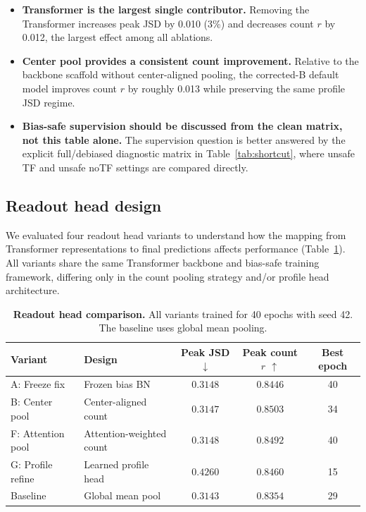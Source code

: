 \documentclass[11pt,a4paper]{article}
\begin{document}
\begin{itemize}[leftmargin=2em]
  \item \textbf{Transformer is the largest single contributor.} Removing
  the Transformer increases peak JSD by 0.010 (3\%) and decreases count
  $r$ by 0.012, the largest effect among all ablations.

  \item \textbf{Center pool provides a consistent count improvement.}
  Relative to the backbone scaffold without center-aligned pooling, the
  corrected-B default model improves count $r$ by roughly 0.013 while
  preserving the same profile JSD regime.

  \item \textbf{Bias-safe supervision should be discussed from the clean
  matrix, not this table alone.} The supervision question is better
  answered by the explicit full/debiased diagnostic matrix in
  Table~\ref{tab:shortcut}, where unsafe TF and unsafe noTF settings are
  compared directly.
\end{itemize}

\subsection{Readout head design}
\label{sec:readout}

We evaluated four readout head variants to understand how the mapping
from Transformer representations to final predictions affects
performance (Table~\ref{tab:readout}). All variants share the same
Transformer backbone and bias-safe training framework, differing only in
the count pooling strategy and/or profile head architecture.

\begin{table}[H]
\centering
\small
\caption{\textbf{Readout head comparison.} All variants trained for
40 epochs with seed 42. The baseline uses global mean pooling.}
\label{tab:readout}
\begin{tabular}{llccc}
\toprule
Variant & Design & Peak JSD $\downarrow$ & Peak count $r$ $\uparrow$
  & Best epoch \\
\midrule
A: Freeze fix & Frozen bias BN & $0.3148$ & $0.8446$ & 40 \\
B: Center pool & Center-aligned count & $\mathbf{0.3147}$ & $\mathbf{0.8503}$ & 34 \\
F: Attention pool & Attention-weighted count & $0.3148$ & $0.8492$ & 40 \\
G: Profile refine & Learned profile head & $0.4260$ & $0.8460$ & 15 \\
\midrule
Baseline & Global mean pool & $0.3143$ & $0.8354$ & 29 \\
\bottomrule
\end{tabular}
\end{table}
\end{document}
